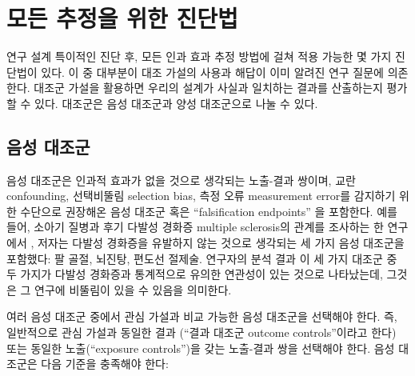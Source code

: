 \documentclass[10.5pt]{book}
\theoremstyle{definition}
\theoremstyle{definition}
\theoremstyle{definition}
\theoremstyle{remark}
\begin{document}
\section{모든 추정을 위한 진단법}\label{---}

연구 설계 특이적인 진단 후, 모든 인과 효과 추정 방법에 걸쳐 적용 가능한
몇 가지 진단법이 있다. 이 중 대부분이 대조 가설의 사용과 해답이 이미
알려진 연구 질문에 의존한다. 대조군 가설을 활용하면 우리의 설계가 사실과
일치하는 결과를 산출하는지 평가할 수 있다. 대조군은 음성 대조군과 양성
대조군으로 나눌 수 있다.

\subsection{음성 대조군}\label{NegativeControls}


음성 대조군은 인과적 효과가 없을 것으로 생각되는 노출-결과 쌍이며, 교란
confounding, \citep{lipsitch_2010} 선택비뚤림 selection bias, 측정 오류
measurement error를 감지하기 위한 수단으로 권장해온 음성 대조군 혹은
``falsification endpoints'' \citep{prased_2013} 을 포함한다.
\citep{arnold_2016} 예를 들어, 소아기 질병과 후기 다발성 경화증 multiple
sclerosis의 관계를 조사하는 한 연구에서 \citep{zaadstra_2008}, 저자는
다발성 경화증을 유발하지 않는 것으로 생각되는 세 가지 음성 대조군을
포함했다: 팔 골절, 뇌진탕, 편도선 절제술. 연구자의 분석 결과 이 세 가지
대조군 중 두 가지가 다발성 경화증과 통계적으로 유의한 연관성이 있는
것으로 나타났는데, 그것은 그 연구에 비뚤림이 있을 수 있음을 의미한다.

여러 음성 대조군 중에서 관심 가설과 비교 가능한 음성 대조군을 선택해야
한다. 즉, 일반적으로 관심 가설과 동일한 결과 (``결과 대조군 outcome
controls''이라고 한다) 또는 동일한 노출(``exposure controls'')을 갖는
노출-결과 쌍을 선택해야 한다. 음성 대조군은 다음 기준을 충족해야 한다:
\end{document}
